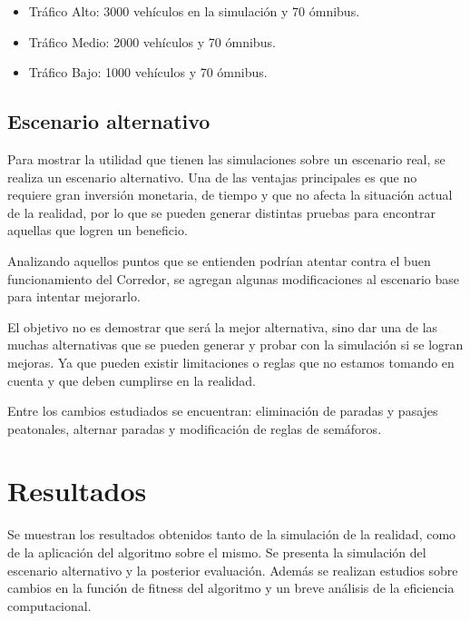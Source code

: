 \begin{itemize}
\item Tráfico Alto:  3000 vehículos en la simulación y 70 ómnibus. 
\item Tráfico Medio: 2000 vehículos y 70 ómnibus.
\item Tráfico Bajo:  1000 vehículos y 70 ómnibus.
\end{itemize}

 




\subsection{Escenario alternativo}

Para mostrar la utilidad que tienen las simulaciones sobre un escenario real, se realiza un escenario alternativo. Una de las ventajas principales es que no requiere gran inversión monetaria, de tiempo y que no afecta la situación actual de la realidad, por lo que se pueden generar distintas pruebas para encontrar aquellas que logren un beneficio.

Analizando aquellos puntos que se entienden podrían atentar contra el buen funcionamiento del Corredor, se agregan algunas modificaciones al escenario base para intentar mejorarlo. 

El objetivo no es demostrar que será la mejor alternativa, sino dar una de las muchas alternativas que se pueden generar y probar con la simulación si se logran mejoras. Ya que pueden existir limitaciones o reglas que no estamos tomando en cuenta y que deben cumplirse en la realidad.

Entre los cambios estudiados se encuentran: eliminación de paradas y pasajes peatonales, alternar paradas y modificación de reglas de semáforos.



\section{Resultados}
Se muestran los resultados obtenidos tanto de la simulación de la realidad, como de la aplicación del algoritmo sobre el mismo. Se presenta la simulación del escenario alternativo y la posterior evaluación. Además se realizan estudios sobre cambios en la función de fitness del algoritmo y un breve análisis de la eficiencia computacional.


